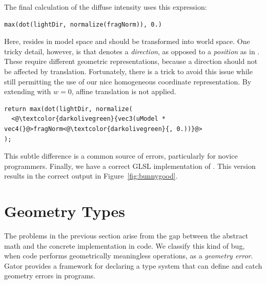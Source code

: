 The final calculation of the diffuse intensity uses this expression:
%
\begin{lstlisting}
max(dot(lightDir, normalize(fragNorm)), 0.)
\end{lstlisting}
%
Here,  resides in model space and should be transformed into world space. One tricky detail, however, is that  denotes a \emph{direction}, as opposed to a \emph{position} as in . 
These require different geometric representations, because a direction should not be affected by translation. 
Fortunately, there is a trick to avoid this issue while still permitting the use of our nice homogeneous coordinate representation.
By extending  with $w = 0$, affine translation is not applied. 
%
\begin{lstlisting}
return max(dot(lightDir, normalize(
  <@\textcolor{darkolivegreen}{vec3(uModel * vec4(}@>fragNorm<@\textcolor{darkolivegreen}{, 0.))}@>
);
\end{lstlisting}
%
This subtle difference is a common source of errors, particularly for novice programmers. 
Finally, we have a correct GLSL implementation of . This version results in the correct output in Figure~\ref{fig:bunnygood}. 

\section{Geometry Types}
\label{sec:langlang}

The problems in the previous section arise from the gap between the abstract math and the concrete implementation in code.
We classify this kind of bug, when code performs geometrically meaningless operations, as a \emph{geometry error}.
Gator provides a framework for declaring a type system that can define and catch geometry errors in programs.

